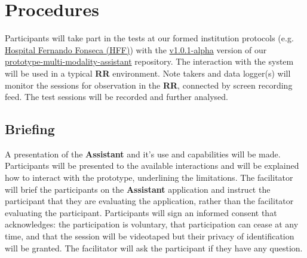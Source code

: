 \section{Procedures}
\label{sec:sec005}

Participants will take part in the tests at our formed institution protocols (e.g. \hyperlink{http://hff.min-saude.pt/}{Hospital Fernando Fonseca (HFF)}) with the \hyperlink{https://github.com/mida-project/prototype-multi-modality-assistant/releases/tag/v1.0.1-alpha}{v1.0.1-alpha} version of our \hyperlink{https://github.com/mida-project/prototype-multi-modality-assistant}{prototype-multi-modality-assistant} repository. The interaction with the system will be used in a typical \textbf{RR} environment. Note takers and data logger(s) will monitor the sessions for observation in the \textbf{RR}, connected by screen recording feed. The test sessions will be recorded and further analysed.


\subsection{Briefing}

A presentation of the \textbf{Assistant} and it's use and capabilities will be made. Participants will be presented to the available interactions and will be explained how to interact with the prototype, underlining the limitations. The facilitator will brief the participants on the \textbf{Assistant} application and instruct the participant that they are evaluating the application, rather than the facilitator evaluating the participant. Participants will sign an informed consent that acknowledges: the participation is voluntary, that participation can cease at any time, and that the session will be videotaped but their privacy of identification will be granted. The facilitator will ask the participant if they have any question.



